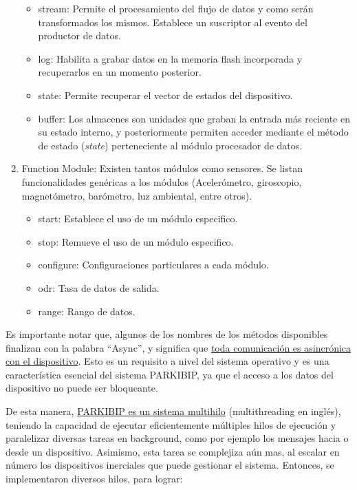 \begin{enumerate}
\begin{itemize}
        \item stream: Permite el procesamiento del flujo de datos y como serán transformados los mismos. Establece un suscriptor al evento del productor de datos.
        \item log: Habilita a grabar datos en la memoria flash incorporada y recuperarlos en un momento posterior.
        \item state: Permite recuperar el vector de estados del dispositivo.
        \item buffer: Los almacenes son unidades que graban la entrada más reciente en su estado interno, y posteriormente permiten acceder mediante el método de estado (\textit{state}) perteneciente al módulo procesador de datos.
    \end{itemize}
    \item Function Module: Existen tantos módulos como sensores. Se listan funcionalidades genéricas a los módulos (Acelerómetro, giroscopio, magnetómetro, barómetro, luz ambiental, entre otros).
    \begin{itemize}
        \item start: Establece el uso de un módulo especifico.
        \item stop: Remueve el uso de un módulo especifico.
        \item configure: Configuraciones particulares a cada módulo.
        \item odr: Tasa de datos de salida.
        \item range: Rango de datos.
    \end{itemize}
\end{enumerate}

Es importante notar que, algunos de los nombres de los métodos disponibles finalizan con la palabra ``Async'', y significa que \underline{toda comunicación es asincrónica con el dispositivo}. Esto es un requisito a nivel del sistema operativo y es una característica esencial del sistema PARKIBIP, ya que el acceso a los datos del dispositivo no puede ser bloqueante. 

De esta manera, \underline{PARKIBIP es un sistema multihilo} (multithreading en inglés), teniendo la capacidad de ejecutar eficientemente múltiples hilos de ejecución y paralelizar diversas tareas en background, como por ejemplo los mensajes hacia o desde un dispositivo. Asimismo, esta tarea se complejiza aún mas, al escalar en número los dispositivos inerciales que puede gestionar el sistema. Entonces, se implementaron diversos hilos, para lograr:


